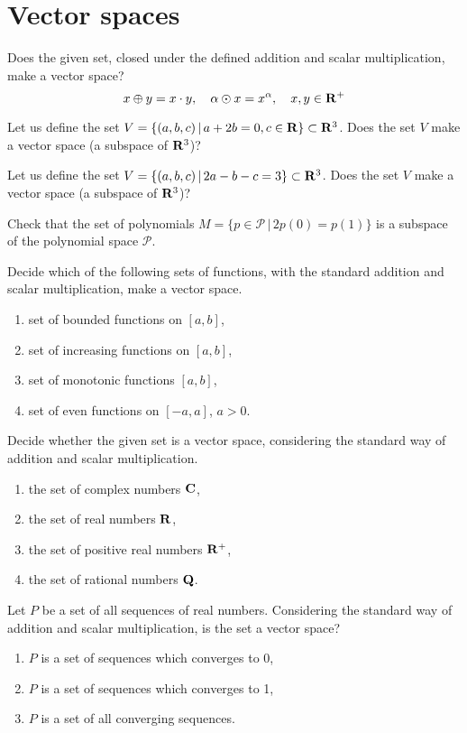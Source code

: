 \documentclass[a4paper,10pt]{book}
\def\Real{{\rm\bf R}}
\def\where{\,|\,}                    %
\begin{document}
\section{Vector spaces}
\exercise \label{ex:vek1} 
Does the given set, closed under the defined addition and scalar multiplication, make a vector space?
\begin{equation}
  x\oplus y=x\cdot y, \quad \alpha \odot x = x^\alpha, \quad x,y \in \Real^{+}  \nonumber
\end{equation}

\exercise \label{ex:vek2} Let us define the set $V=\{(a,b,c)\where a+2b=0, c\in\Real\}\subset \Real^3$. 
Does the set $V$ make a vector space (a subspace of $\Real^3$)?

\exercise \label{ex:vek3} 
Let us define the set $V=\{(a,b,c)\where 2a-b-c=3\}\subset \Real^3$. 
Does the set $V$ make a vector space (a subspace of $\Real^3$)?

\exercise \label{ex:vek4} 
Check that the set of polynomials $M=\{p\in\mathcal{P}\where 2p(0)=p(1)\}$ is a subspace 
of the polynomial space $\mathcal{P}$.

\exercise \label{ex:vek5} 
Decide which of the following sets of functions, with the standard addition and scalar multiplication,
make a vector space.
\begin{enumerate}[label=\alph*)]
\item set of bounded functions on $[a, b]$,
\item set of increasing functions on $[a, b]$,
\item set of monotonic functions $[a, b]$,
\item set of even functions on $[-a, a]$, $a > 0$.
\end{enumerate}

\exercise \label{ex:vek6} 
Decide whether the given set is a vector space, considering the standard way of addition 
and scalar multiplication.
\begin{enumerate}[label=\alph*)]
\item the set of complex numbers $\rm\bf{C}$,
\item the set of real numbers $\Real$,
\item the set of positive real numbers $\Real^+$,
\item the set of rational numbers $\rm\bf{Q}$.
\end{enumerate}

\exercise \label{ex:vek7} 
Let $P$ be a set of all sequences of real numbers. Considering the standard way of addition
and scalar multiplication, is the set a vector space?
\begin{enumerate}[label=\alph*)]
\item $P$ is a set of sequences which converges to 0,
\item $P$ is a set of sequences which converges to 1,
\item $P$ is a set of all converging sequences.
\end{enumerate}
\end{document}

